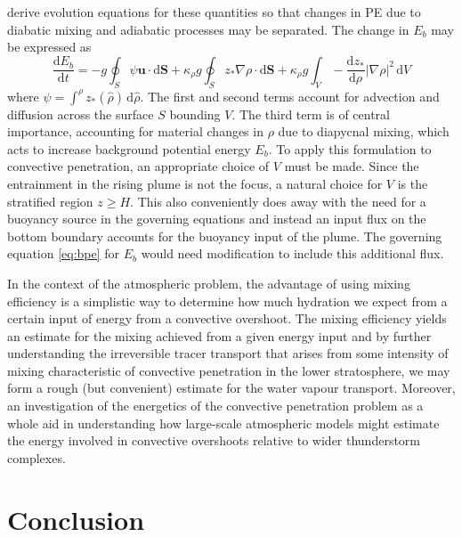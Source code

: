 \documentclass[a4paper]{article}
\begin{document}
\citet{winters1995} derive evolution equations for these quantities so that changes in PE due to diabatic
mixing and adiabatic processes may be separated. The change in $E_b$ may be expressed as
\begin{equation}
	\frac{\mathrm{d} E_b}{\mathrm{d}t} = -g\oint_S \psi \bm{u}\cdot \mathrm{d}\bm{S} + \kappa_\rho g \oint_S z_*
	\nabla \rho \cdot \mathrm{d}\bm{S} + \kappa_\rho g \int_V -\frac{\mathrm{d}z_*}{\mathrm{d}\rho} \left|
	\nabla \rho \right|^2 \,\mathrm{d}V \label{eq:bpe}
\end{equation}
where $\psi = \int^\rho z_*(\hat{\rho}) \, \mathrm{d}\hat{\rho}$. The first and second terms account for
advection and diffusion across the surface $S$ bounding $V$. The third term is of central importance,
accounting for material changes in $\rho$ due to diapycnal mixing, which acts to increase background potential
energy $E_b$. To apply this formulation to convective penetration, an appropriate choice of $V$ must be made.
Since the entrainment in the rising plume is not the focus, a natural choice for $V$ is the stratified region
$z \geq H$. This also conveniently does away with the need for a buoyancy source in the governing equations
and instead an input flux on the bottom boundary accounts for the buoyancy input of the plume. The governing
equation \eqref{eq:bpe} for $E_b$ would need modification to include this additional flux.

In the context of the atmospheric problem, the advantage of using mixing efficiency is a simplistic way to
determine how much hydration we expect from a certain input of energy from a convective overshoot. The mixing
efficiency yields an estimate for the mixing achieved from a given energy input and by further understanding
the irreversible tracer transport that arises from some intensity of mixing characteristic of convective
penetration in the lower stratosphere, we may form a rough (but convenient) estimate for the water vapour
transport. Moreover, an investigation of the energetics of the convective penetration problem as a whole aid
in understanding how large-scale atmospheric models might estimate the energy involved in convective
overshoots relative to wider thunderstorm complexes.

\section{Conclusion}
	
\end{document}
